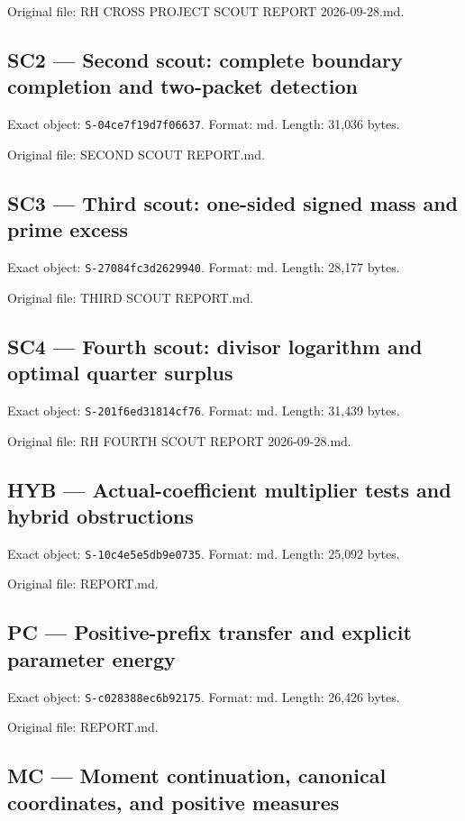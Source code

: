 \documentclass[
  10pt,
  a4paper,
  10pt,
  oneside,
  openany]{book}
\begin{document}
Original file: RH CROSS PROJECT SCOUT REPORT 2026-09-28.md.

\subsection{SC2 --- Second scout: complete boundary completion and
two-packet detection}\label{source-sc2}

Exact object: \texttt{S-04ce7f19d7f06637}. Format: md. Length: 31,036
bytes.

Original file: SECOND SCOUT REPORT.md.

\subsection{SC3 --- Third scout: one-sided signed mass and prime
excess}\label{source-sc3}

Exact object: \texttt{S-27084fc3d2629940}. Format: md. Length: 28,177
bytes.

Original file: THIRD SCOUT REPORT.md.

\subsection{SC4 --- Fourth scout: divisor logarithm and optimal quarter
surplus}\label{source-sc4}

Exact object: \texttt{S-201f6ed31814cf76}. Format: md. Length: 31,439
bytes.

Original file: RH FOURTH SCOUT REPORT 2026-09-28.md.

\subsection{HYB --- Actual-coefficient multiplier tests and hybrid
obstructions}\label{source-hyb}

Exact object: \texttt{S-10c4e5e5db9e0735}. Format: md. Length: 25,092
bytes.

Original file: REPORT.md.

\subsection{PC --- Positive-prefix transfer and explicit parameter
energy}\label{source-pc}

Exact object: \texttt{S-c028388ec6b92175}. Format: md. Length: 26,426
bytes.

Original file: REPORT.md.

\subsection{MC --- Moment continuation, canonical coordinates, and
positive measures}\label{source-mc}
\end{document}
